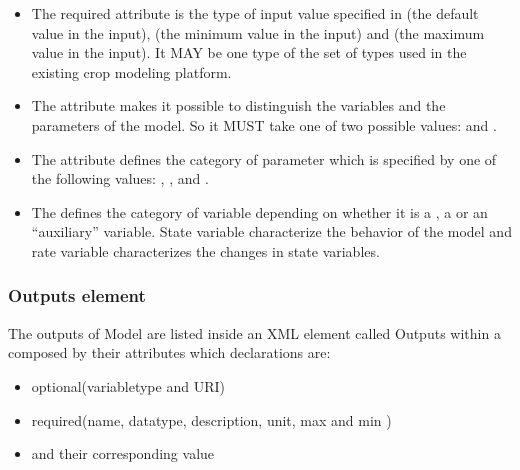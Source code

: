 \documentclass[letterpaper,10pt,english]{sphinxmanual}
\begin{document}
\begin{itemize}
\item {} 
The required  attribute is the type of input value specified in  (the default value in the input),  (the minimum value in the input) and  (the maximum value in the input). It MAY be one type of the set of types used in the existing crop modeling platform.

\item {} 
The  attribute makes it possible to distinguish the variables and the parameters of the model. So it MUST take one of two possible values:  and .

\item {} 
The  attribute defines the category of parameter which is specified by one of the following values: , ,  and .

\item {} 
The  defines the category of variable depending on whether it is a , a  or an “auxiliary” variable.  State variable characterize the behavior of the model and rate variable characterizes the changes in state variables.

\end{itemize}


\subsubsection{Outputs element}
\label{\detokenize{user/description:outputs-element}}
The outputs of Model are listed inside an XML element called Outputs within a 
composed by their attributes which declarations are:
\begin{itemize}
\item {} 
optional(variabletype and URI)

\item {} 
required(name, datatype, description, unit, max and min )

\item {} 
and their corresponding value

\end{itemize}
\end{document}
